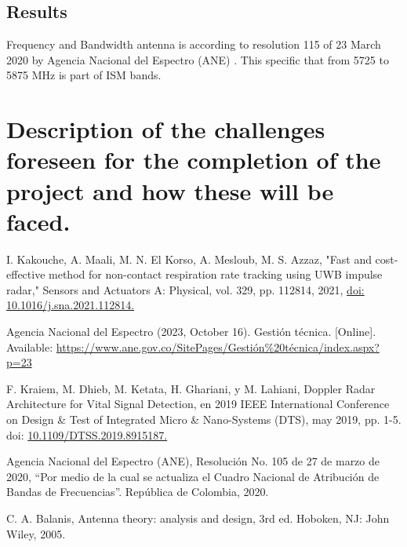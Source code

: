 \documentclass[lettersize,journal]{IEEEtran}
\begin{document}
\subsection{Results}


Frequency and Bandwidth antenna is according to resolution 115 of 23 March 2020  by Agencia Nacional del Espectro (ANE) \cite{ANERes105}. This specific that from 5725 to 5875 MHz  is part of ISM bands.   

\section{Description of the challenges foreseen for the completion of the project and how these will be faced.}








\begin{thebibliography}{1}


I. Kakouche, A. Maali, M. N. El Korso, A. Mesloub, M. S. Azzaz, "Fast and cost-effective method for non-contact respiration rate tracking using UWB impulse radar," Sensors and Actuators A: Physical, vol. 329, pp. 112814, 2021, \url{doi: 10.1016/j.sna.2021.112814.}

Agencia Nacional del Espectro (2023, October 16). Gestión técnica. [Online]. Available: \url{https://www.ane.gov.co/SitePages/Gestión%20técnica/index.aspx?p=23}

F. Kraiem, M. Dhieb, M. Ketata, H. Ghariani, y M. Lahiani, Doppler Radar Architecture for Vital Signal Detection, en 2019 IEEE International Conference on Design \& Test of Integrated Micro \& Nano-Systems (DTS), may 2019, pp. 1-5. doi: \url{10.1109/DTSS.2019.8915187.}

 Agencia Nacional del Espectro (ANE), Resolución No. 105 de 27 de marzo de 2020, ``Por medio de la cual se actualiza el Cuadro Nacional de Atribución de Bandas de Frecuencias''. República de Colombia, 2020.


 C. A. Balanis, Antenna theory: analysis and design, 3rd ed. Hoboken, NJ: John Wiley, 2005.


\end{thebibliography}
\end{document}
